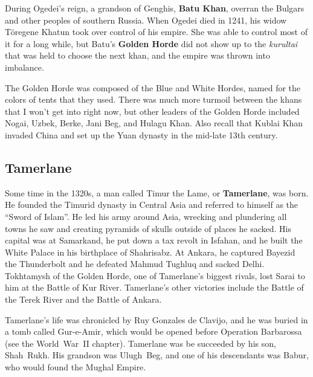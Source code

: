 During Ogedei's reign, a grandson of Genghis, \textbf{Batu Khan},
overran the Bulgars and other peoples of southern Russia.
When Ogedei died in 1241, his widow T\"oregene Khatun took over control of his empire.
She was able to control most of it for a long while,
but Batu's \textbf{Golden Horde} did not show up to the
\textit{kurultai} that was held to choose the next khan,
and the empire was thrown into imbalance.

The Golden Horde was composed of the Blue and White Hordes,
named for the colors of tents that they used.
There was much more turmoil between the khans that I won't get into right now,
but other leaders of the Golden Horde included Nogai, Uzbek, Berke, Jani Beg, and Hulagu Khan.
Also recall that Kublai Khan invaded China and set up the Yuan dynasty in the mid-late 13th century.

\subsection*{Tamerlane}

Some time in the 1320s, a man called Timur the Lame, or \textbf{Tamerlane}, was born.
He founded the Timurid dynasty in Central Asia
and referred to himself as the ``Sword of Islam''.
He led his army around Asia,
wrecking and plundering all towns he saw and creating pyramids of skulls outside of places he sacked.
His capital was at Samarkand, he put down a tax revolt in Isfahan,
and he built the White Palace in his birthplace of Shahrisabz.
At Ankara, he captured Bayezid the Thunderbolt and he defeated Mahmud Tughluq and sacked Delhi.
Tokhtamysh of the Golden Horde, one of Tamerlane's biggest rivals,
lost Sarai to him at the Battle of Kur River.
Tamerlane's other victories include the Battle of the Terek River and the Battle of Ankara.

Tamerlane's life was chronicled by Ruy Gonzales de Clavijo,
and he was buried in a tomb called Gur-e-Amir,
which would be opened before Operation Barbarossa (see the World~War~II chapter).
Tamerlane was be succeeded by his son, Shah~Rukh.
His grandson was Ulugh~Beg,
and one of his descendants was Babur, who would found the Mughal Empire.

